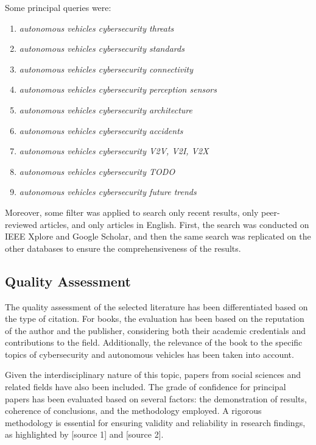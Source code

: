 Some principal queries were:
\begin{enumerate}
    \item \textit{autonomous vehicles cybersecurity threats}
    \item \textit{autonomous vehicles cybersecurity standards}
    \item \textit{autonomous vehicles cybersecurity connectivity}
    \item \textit{autonomous vehicles cybersecurity perception sensors}
    \item \textit{autonomous vehicles cybersecurity architecture}
    \item \textit{autonomous vehicles cybersecurity accidents}
    \item \textit{autonomous vehicles cybersecurity V2V, V2I, V2X}
    \item \textit{autonomous vehicles cybersecurity TODO}
    \item \textit{autonomous vehicles cybersecurity future trends}
\end{enumerate}

Moreover, some filter was applied to search only recent results, only peer-reviewed articles, and only articles in English.
First, the search was conducted on IEEE Xplore and Google Scholar, and then the same search was replicated on the other databases to ensure the comprehensiveness of the results.

\subsection{Quality Assessment}\label{subsec:quality-assessment}
The quality assessment of the selected literature has been differentiated based on the type of citation.
For books, the evaluation has been based on the reputation of the author and the publisher, considering both their academic credentials and contributions to the field.
Additionally, the relevance of the book to the specific topics of cybersecurity and autonomous vehicles has been taken into account.

Given the interdisciplinary nature of this topic, papers from social sciences and related fields have also been included.
The grade of confidence for principal papers has been evaluated based on several factors: the demonstration of results, coherence of conclusions, and the methodology employed.
A rigorous methodology is essential for ensuring validity and reliability in research findings, as highlighted by [source 1] and [source 2].

